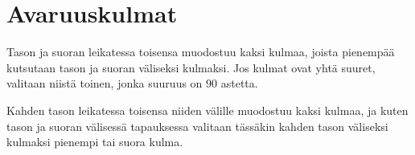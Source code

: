 \section*{Avaruuskulmat}

Tason ja suoran leikatessa toisensa muodostuu kaksi kulmaa, joista pienempää kutsutaan tason ja suoran väliseksi kulmaksi. Jos kulmat ovat yhtä suuret, valitaan niistä toinen, jonka suuruus on 90 astetta. %

Kahden tason leikatessa toisensa niiden välille muodostuu kaksi kulmaa, ja kuten tason ja suoran välisessä tapauksessa valitaan tässäkin kahden tason väliseksi kulmaksi pienempi tai suora kulma.
